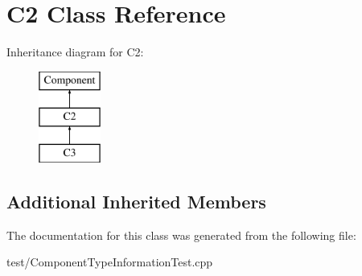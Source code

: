 \hypertarget{classC2}{}\section{C2 Class Reference}
\label{classC2}
Inheritance diagram for C2\+:\begin{figure}[H]
\begin{center}
\leavevmode
\includegraphics[height=3.000000cm]{classC2}
\end{center}
\end{figure}
\subsection*{Additional Inherited Members}


The documentation for this class was generated from the following file\+:\begin{DoxyCompactItemize}
\item 
test/Component\+Type\+Information\+Test.\+cpp\end{DoxyCompactItemize}
